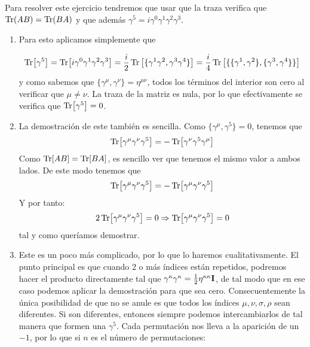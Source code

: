 \begin{solucion} 
	Para resolver este ejercicio tendremos que usar que la traza verifica que $\Tr (AB) = \Tr(BA)$ y que además $\gamma^5 = i \gamma^0\gamma^1\gamma^2\gamma^3$. 
	\begin{enumerate}[label=\alph*)]
		\item Para esto aplicamos simplemente que 
		
		\begin{equation*}
			\Tr [\gamma^5 ] = \Tr [i \gamma^0\gamma^1\gamma^2\gamma^3] = \frac{i}{2} \Tr \left[ \{ \gamma^1 \gamma^2,\gamma^3 \gamma^4 \}   \right] = \frac{i}{4} \Tr \left[ \{ \{ \gamma^1 ,\gamma^2 \},\{ \gamma^3, \gamma^4 \} \}   \right]
		\end{equation*}
		y como sabemos que $\{\gamma^\mu, \gamma^\nu \} = \eta^{\mu \nu}$, todos los términos del interior son cero al verificar que $\mu \neq \nu$. La traza de la matriz es nula, por lo que efectivamente se verifica que $\Tr [\gamma^5] = 0$.
		
		\item La demostración de este también es sencilla. Como $\{\gamma^\mu ,\gamma^5\}=0$, tenemos que 
		\begin{equation*}
			\Tr [\gamma^\mu \gamma^\nu \gamma^5 ] = - \Tr [\gamma^{\nu} \gamma^5 \gamma^\mu ]  
		\end{equation*}
		Como $\Tr[AB]=\Tr[BA]$, es sencillo ver que tenemos el mismo valor a ambos lados. De este modo tenemos que 
		\begin{equation*}
			\Tr [\gamma^\mu \gamma^\nu \gamma^5 ] = - \Tr [\gamma^\mu \gamma^\nu \gamma^5 ] 
		\end{equation*}
		Y por tanto:
		\begin{equation*}
			2\Tr [\gamma^\mu \gamma^\nu \gamma^5 ] = 0 \Rightarrow \Tr [\gamma^\mu \gamma^\nu \gamma^5 ]  = 0
		\end{equation*}
		tal y como queríamos demostrar.
		
		\item Este es un poco más complicado, por lo que lo haremos cualitativamente. El punto principal es que cuando 2 o más índices están repetidos, podremos hacer el producto directamente tal que $\gamma^\kappa \gamma^\kappa = \frac{1}{2}\eta^{\kappa \kappa} \mathbf{I}$, de tal modo que en ese caso podemos aplicar la demostración para que sea cero. Consecuentemente la única posibilidad de que no se anule es que todos los índices $\mu,\nu,\sigma,\rho$ sean diferentes. Si son diferentes, entonces siempre podemos intercambiarlos de tal manera que formen una $\gamma^5$. Cada permutación nos lleva a la aparición de un $-1$, por lo que si $n$ es el número de permutaciones:
		

\end{enumerate}
\end{solucion}
